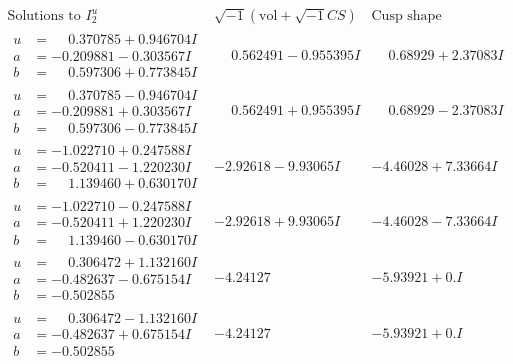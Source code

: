 \documentclass[1p]{elsarticle_modified}
\theoremstyle{definition}
\newcommand{\I}{\sqrt{-1}}
\begin{document}
$$\begin{array}{c|c|c}  
\text{Solutions to }I^u_{2}& \I (\text{vol} + \sqrt{-1}CS) & \text{Cusp shape}\\
 \hline 
\begin{aligned}
u &= \phantom{-}0.370785 + 0.946704 I \\
a &= -0.209881 - 0.303567 I \\
b &= \phantom{-}0.597306 + 0.773845 I\end{aligned}
 & \phantom{-}0.562491 - 0.955395 I & \phantom{-}0.68929 + 2.37083 I \\ \hline\begin{aligned}
u &= \phantom{-}0.370785 - 0.946704 I \\
a &= -0.209881 + 0.303567 I \\
b &= \phantom{-}0.597306 - 0.773845 I\end{aligned}
 & \phantom{-}0.562491 + 0.955395 I & \phantom{-}0.68929 - 2.37083 I \\ \hline\begin{aligned}
u &= -1.022710 + 0.247588 I \\
a &= -0.520411 - 1.220230 I \\
b &= \phantom{-}1.139460 + 0.630170 I\end{aligned}
 & -2.92618 - 9.93065 I & -4.46028 + 7.33664 I \\ \hline\begin{aligned}
u &= -1.022710 - 0.247588 I \\
a &= -0.520411 + 1.220230 I \\
b &= \phantom{-}1.139460 - 0.630170 I\end{aligned}
 & -2.92618 + 9.93065 I & -4.46028 - 7.33664 I \\ \hline\begin{aligned}
u &= \phantom{-}0.306472 + 1.132160 I \\
a &= -0.482637 - 0.675154 I \\
b &= -0.502855\phantom{ +0.000000I}\end{aligned}
 & -4.24127\phantom{ +0.000000I} & -5.93921 + 0. I\phantom{ +0.000000I} \\ \hline\begin{aligned}
u &= \phantom{-}0.306472 - 1.132160 I \\
a &= -0.482637 + 0.675154 I \\
b &= -0.502855\phantom{ +0.000000I}\end{aligned}
 & -4.24127\phantom{ +0.000000I} & -5.93921 + 0. I\phantom{ +0.000000I} \\ \hline\begin{aligned}

\end{aligned}
\end{array}$$
\end{document}
